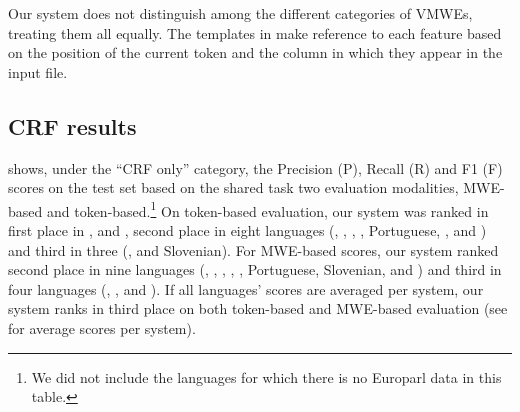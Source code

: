 \documentclass[output=paper,modfonts,nonflat]{langsci/langscibook}
\begin{document}
Our system does not distinguish among the different categories of VMWEs, treating them all equally. The templates in
 make reference to each feature based on
the position of the current token and the column in which they appear
in the input file.

\subsection{CRF results} 







 shows, under the ``CRF only'' category, the Precision (P), Recall (R) and F1 (F) scores on the test set based on the shared task two evaluation modalities, MWE-based and token-based.\footnote{We did not include the languages for which there is no
  Europarl data in this table.} On token-based evaluation, our system was ranked in first place in ,  and , second place in eight languages (, , , , Portuguese, ,  and ) and third in three (,  and Slovenian). For MWE-based scores, our system ranked second place in nine languages (, , , , , Portuguese, Slovenian,  and ) and third in four languages (, ,  and ). If all languages' scores are averaged per system, our system ranks in third place on both token-based and MWE-based evaluation (see  for average scores per system).
\end{document}

